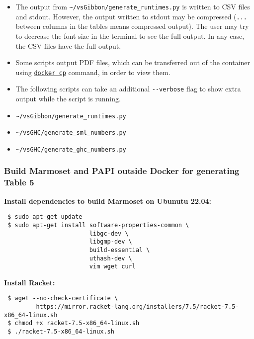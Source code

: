 \begin{itemize}
\item
  The output from
  \texttt{\textasciitilde{}/vsGibbon/generate\_runtimes.py} is written
  to CSV files and stdout. However, the output written to stdout may be
  compressed (\texttt{...} between columns in the tables means
  compressed output). The user may try to decrease the font size in the
  terminal to see the full output. In any case, the CSV files have the
  full output.
\item
  Some scripts output PDF files, which can be transferred out of the
  container using
  \href{https://docs.docker.com/engine/reference/commandline/container_cp/}{\texttt{docker\ cp}}
  command, in order to view them.
\item The following scripts can take an additional \texttt{-\/-verbose} flag to show extra output while the
script is running.
  \item \texttt{\textasciitilde{}/vsGibbon/generate\_runtimes.py}
  \item \texttt{\textasciitilde{}/vsGHC/generate\_sml\_numbers.py}
  \item \texttt{\textasciitilde{}/vsGHC/generate\_ghc\_numbers.py} 
  
\end{itemize}

\hypertarget{build-marmoset-and-papi-outside-docker-for-generating-table-5}{%
\subsubsection{Build Marmoset and PAPI outside Docker for generating
Table
5}\label{build-marmoset-and-papi-outside-docker-for-generating-table-5}}

\textbf{Install dependencies to build Marmoset on Ubunutu 22.04:}
\begin{verbatim}
 $ sudo apt-get update 
 $ sudo apt-get install software-properties-common \
                        libgc-dev \
                        libgmp-dev \
                        build-essential \
                        uthash-dev \
                        vim wget curl
\end{verbatim}

\textbf{Install Racket:}
\begin{verbatim}
 $ wget --no-check-certificate \
         https://mirror.racket-lang.org/installers/7.5/racket-7.5-x86_64-linux.sh
 $ chmod +x racket-7.5-x86_64-linux.sh
 $ ./racket-7.5-x86_64-linux.sh
\end{verbatim}

